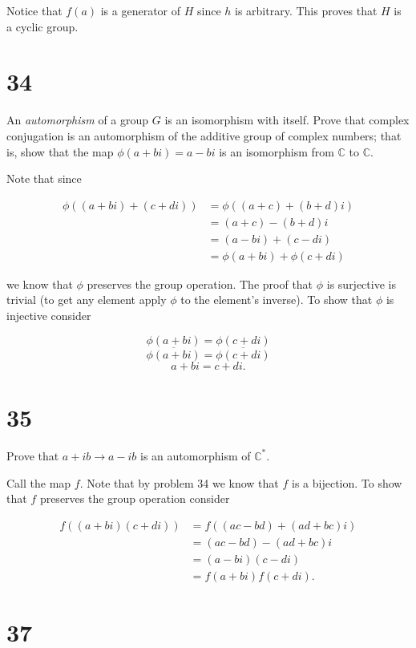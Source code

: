 \documentclass[a4paper]{article}
\begin{document}
Notice that $f(a)$ is a generator of $H$ since $h$ is arbitrary. This proves that $H$ is a cyclic group.


\section*{34}

An \textit{automorphism} of a group $G$ is an isomorphism with itself. Prove that complex conjugation is an automorphism of the additive group of complex numbers; that is, show that the map $\phi(a+bi) = a - bi$ is an isomorphism from $\mathbb{C}$ to $\mathbb{C}$.

\vspace{\baselineskip}

Note that since

\begin{align*}
\phi((a+bi) + (c+di)) &= \phi((a+c) + (b+d)i) \\
&= (a+c) - (b+d)i \\
&= (a-bi) + (c-di) \\
&= \phi(a+bi) + \phi(c+di)
\end{align*}

we know that $\phi$ preserves the group operation. The proof that $\phi$ is surjective is trivial (to get any element apply $\phi$ to the element's inverse). To show that $\phi$ is injective consider

$$\phi(a+bi) = \phi(c+di)$$
$$\overline{\phi(a+bi)} = \overline{\phi(c+di)}$$
$$a + bi = c + di.$$


\section*{35}

Prove that $a + ib \rightarrow a- ib$ is an automorphism of $\mathbb{C}^*$.

\vspace{\baselineskip}

Call the map $f$. Note that by problem 34 we know that $f$ is a bijection. To show that $f$ preserves the group operation consider

\begin{align*}
f((a+bi) (c+di)) &= f((ac - bd) + (ad + bc)i) \\
&= (ac - bd) - (ad + bc)i \\
&= (a-bi)(c-di) \\
&= f(a+bi) f(c+di).
\end{align*}


\section*{37}
\end{document}
